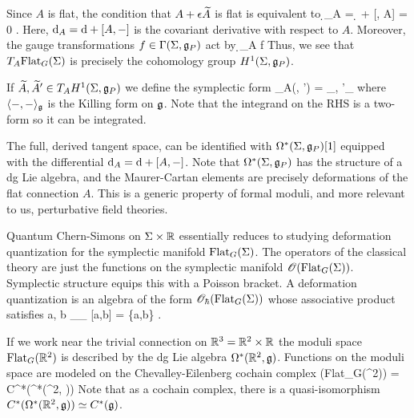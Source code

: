 \documentclass[10pt]{amsart}
\begin{document}
Since $A$ is flat, the condition that $A + \epsilon \Tilde{A}$ is flat is equivalent to 
\ben
\d_A  = \d {} + [, A] = 0 .
\een 
Here, $\d_A = \d + [A,-]$ is the covariant derivative with respect to $A$. 
Moreover, the gauge transformations $f \in \Gamma(\Sigma, \fg_P)$ act by
\ben
{} \mapsto \d_A f
\een
Thus, we see that $T_A{\rm Flat}_G(\Sigma)$ is precisely the cohomology group $H^1(\Sigma, \fg_P)$. 

If $\Tilde{A}, \Tilde{A}' \in T_A H^1(\Sigma, \fg_P)$ we define the symplectic form
\ben
\omega_A(, ') = \int_\Sigma \<, '\>_\fg
\een
where $\<-,-\>_\fg$ is the Killing form on $\fg$. 
Note that the integrand on the RHS is a two-form so it can be integrated.

The full, derived tangent space, can be identified with $\Omega^*(\Sigma, \fg_P)[1]$ equipped with the differential $\d_A = \d + [A,-]$. 
Note that $\Omega^*(\Sigma, \fg_P)$ has the structure of a dg Lie algebra, and the Maurer-Cartan elements are precisely deformations of the flat connection $A$. 
This is a generic property of formal moduli, and more relevant to us, perturbative field theories. 

Quantum Chern-Simons on $\Sigma \times \RR$ essentially reduces to studying deformation quantization for the symplectic manifold ${\rm Flat}_G(\Sigma)$. 
The operators of the classical theory are just the functions on the symplectic manifold $\sO({\rm Flat}_G(\Sigma))$.
Symplectic structure equips this with a Poisson bracket. 
A deformation quantization is an algebra of the form $\sO_{\hbar}({\rm Flat}_G(\Sigma))$ whose associative product satisfies
\ben
a, b \in \sO_\hbar \implies \lim_{\hbar {}}  [a,b] = \{a,b\} .
\een

If we work near the trivial connection on $\RR^3 = \RR^2 \times \RR$ the moduli space ${\rm Flat}_G(\RR^2)$ is described by the dg Lie algebra $\Omega^*(\RR^2, \fg)$. 
Functions on the moduli space are modeled on the Chevalley-Eilenberg cochain complex
\ben
\sO({\rm Flat}_G(\RR^2)) = C^*(\Omega^*(\RR^2, \fg))
\een 
Note that as a cochain complex, there is a quasi-isomorphism $C^*(\Omega^*(\RR^2, \fg)) \simeq C^*(\fg)$. 

\ben
{}
\een
\end{document}
